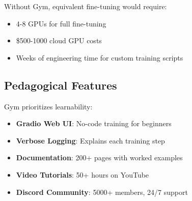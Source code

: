 Without Gym, equivalent fine-tuning would require:
\begin{itemize}
\item 4-8 GPUs for full fine-tuning
\item \$500-1000 cloud GPU costs
\item Weeks of engineering time for custom training scripts
\end{itemize}

\subsection{Pedagogical Features}

Gym prioritizes learnability:

\begin{itemize}
\item \textbf{Gradio Web UI}: No-code training for beginners
\item \textbf{Verbose Logging}: Explains each training step
\item \textbf{Documentation}: 200+ pages with worked examples
\item \textbf{Video Tutorials}: 50+ hours on YouTube
\item \textbf{Discord Community}: 5000+ members, 24/7 support
\end{itemize}

